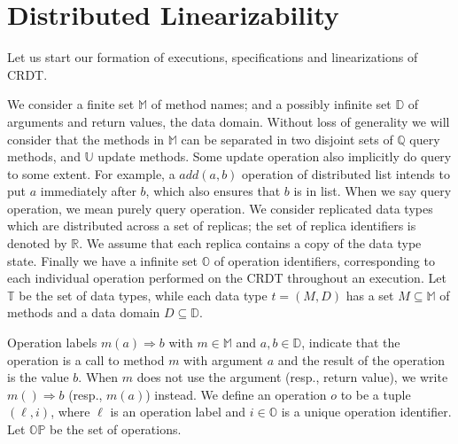 
\section{Distributed Linearizability}
\label{sec:distributed-lin}

Let us start our formation of executions, specifications and linearizations of CRDT.

We consider a finite set $\mathbb{M}$ of method names; and a possibly infinite set $\mathbb{D}$ of arguments and return values, the data domain. Without loss of generality we will consider that the methods in $\mathbb{M}$ can be separated in two disjoint sets of $\mathbb{Q}$ query methods, and $\mathbb{U}$ update methods. Some update operation also implicitly do query to some extent. For example, a $add(a,b)$ operation of distributed list intends to put $a$ immediately after $b$, which also ensures that $b$ is in list. When we say query operation, we mean purely query operation.
We consider replicated data types which are distributed across a set of replicas; the set of replica identifiers is denoted by $\mathbb{R}$. We assume that each replica contains a copy of the data type state. Finally we have a infinite set $\mathbb{O}$ of operation identifiers, corresponding to each individual operation performed on the CRDT throughout an execution. Let $\mathbb{T}$ be the set of data types, while each data type $t = (M,D)$ has a set $M \subseteq \mathbb{M}$ of methods and a data domain $D \subseteq \mathbb{D}$.

Operation labels \mbox{$m(a)\Rightarrow b$} with $m \in \mathbb{M}$ and $a,b \in \mathbb{D}$, indicate that the operation is a call to method $m$ with argument $a$ and the result of the operation is the value $b$. When $m$ does not use the argument (resp., return value), we write $m()\Rightarrow b$ (resp., $m(a)$) instead. We define an operation $o$ to be a tuple $(\ell,i)$, where $\ell$ is an operation label and $i \in \mathbb{O}$ is a unique operation identifier. Let $\mathbb{OP}$ be the set of operations.

